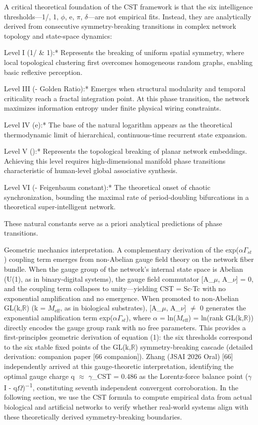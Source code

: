 \documentclass[a4paper,12pt]{article}
\begin{document}
A critical theoretical foundation of the CST framework is that the six intelligence thresholds---{1/, 1, $\phi$, e, $\pi$, $\delta$}---are not empirical fits. Instead, they are analytically derived from consecutive symmetry-breaking transitions in complex network topology and state-space dynamics:


Level I (1/ \& 1):* Represents the breaking of uniform spatial symmetry, where local topological clustering first overcomes homogeneous random graphs, enabling basic reflexive perception.


Level III (\phi - Golden Ratio):* Emerges when structural modularity and temporal criticality reach a fractal integration point. At this phase transition, the network maximizes information entropy under finite physical wiring constraints.


Level IV (e):* The base of the natural logarithm appears as the theoretical thermodynamic limit of hierarchical, continuous-time recurrent state expansion.


Level V (\pi):* Represents the topological breaking of planar network embeddings. Achieving this level requires high-dimensional manifold phase transitions characteristic of human-level global associative synthesis.


Level VI (\delta - Feigenbaum constant):* The theoretical onset of chaotic synchronization, bounding the maximal rate of period-doubling bifurcations in a theoretical super-intelligent network.


These natural constants serve as a priori analytical predictions of phase transitions.


Geometric mechanics interpretation.
A complementary derivation of the exp($\alpha$\cdot$\Gamma_{st}$) coupling term emerges from non-Abelian gauge field theory on the network fiber bundle.
When the gauge group of the network's internal state space is Abelian (U(1), as in binary-digital systems), the gauge field commutator [A_$\mu$, A_$\nu$] = 0, and the coupling term collapses to unity---yielding CST = Sc$\cdot$Tc with no exponential amplification and no emergence.
When promoted to non-Abelian GL(k,$\mathbb{R}$) (k = $M_{\text{eff}}$, as in biological substrates), [A_$\mu$, A_$\nu$] $\neq$ 0 generates the exponential amplification term exp($\alpha$\cdot$\Gamma_{st}$), where $\alpha$ = ln($M_{\text{eff}}$) = ln(rank GL(k,$\mathbb{R}$)) directly encodes the gauge group rank with no free parameters.
This provides a first-principles geometric derivation of equation (1): the six thresholds correspond to the six stable fixed points of the GL(k,$\mathbb{R}$) symmetry-breaking cascade (detailed derivation: companion paper [66 companion]).
Zhang (JSAI 2026 Oral) [66] independently arrived at this gauge-theoretic interpretation, identifying the optimal gauge charge q $\approx$ $\gamma$_CST = 0.486 as the Lorentz-force balance point ($\gamma$I - q$\Omega$)\textsuperscript{$-$}\textsuperscript{1}, constituting seventh independent convergent corroboration.
In the following section, we use the CST formula to compute empirical data from actual biological and artificial networks to verify whether real-world systems align with these theoretically derived symmetry-breaking boundaries.
\end{document}
